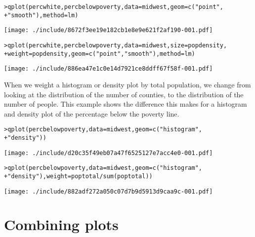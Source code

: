 \begin{alltt}
> qplot(percwhite, percbelowpoverty, data = midwest, geom = c("point", 
+     "smooth"), method = lm)
\end{alltt}
\texttt{[image: ./include/8672f3ee19e182cb1e8e9e621f2af190-001.pdf]}
\begin{alltt}

> qplot(percwhite, percbelowpoverty, data = midwest, size = popdensity, 
+     weight = popdensity, geom = c("point", "smooth"), method = lm)
\end{alltt}
\texttt{[image: ./include/886ea47e1c0e14d7921ce8ddff67f58f-001.pdf]}
\begin{alltt}

\end{alltt}

When we weight a histogram or density plot by total population, we change from looking at the distribution of the number of counties, to the distribution of the number of people.  This example shows the difference this makes for a histogram and density plot of the percentage below the poverty line.

\begin{alltt}
> qplot(percbelowpoverty, data = midwest, geom = c("histogram", 
+     "density"))
\end{alltt}
\texttt{[image: ./include/d20c35f49eb07a47f6525127e7acc4e0-001.pdf]}
\begin{alltt}

> qplot(percbelowpoverty, data = midwest, geom = c("histogram", 
+     "density"), weight = poptotal/sum(poptotal))
\end{alltt}
\texttt{[image: ./include/882adf272a050c07d7b9d5913d9caa9c-001.pdf]}
\begin{alltt}

\end{alltt}

\section{Combining plots}\label{sec:combining_plots}

